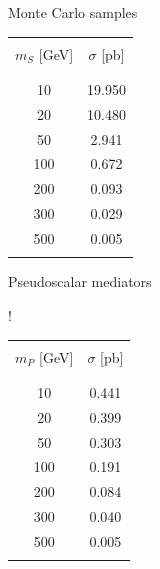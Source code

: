 \documentclass[handout,8 pt]{beamer}
\begin{document}
\begin{frame}{Monte Carlo samples}
\begin{minipage}[c]{.22\linewidth}
\begin{table}
{\begin{tabular}{c|c}
& \\
$m_S$ [GeV] & $\sigma$ [pb] \\
& \\
 \hline \hline
 & \\
10 & 19.950 \\
20 & 10.480 \\
50 & 2.941 \\
100 & 0.672 \\
200 & 0.093 \\
300 & 0.029 \\
500 & 0.005 \\
& \\
\end{tabular}
}
\end{table} 	
   	\end{minipage} \hfill
	\begin{minipage}[c]{.22\linewidth}
	\begin{center}
	\begin{exampleblock}{} \begin{center} Pseudoscalar mediators \end{center} \end{exampleblock}
	\end{center}
	\vspace{-8pt}
\begin{table}
\centering
\resizebox{74pt} {!}{
\begin{tabular}{c|c}
& \\
$m_P$ [GeV] & $\sigma$ [pb] \\
& \\
 \hline \hline
 & \\
10 & 0.441 \\
20 & 0.399 \\
50 & 0.303 \\
100 & 0.191 \\
200 & 0.084 \\
300 & 0.040 \\
500 & 0.005 \\
& \\
\end{tabular}
}
\end{table} 	
   	\end{minipage} \hfill \vfill	
	
\end{frame}
\end{document}
